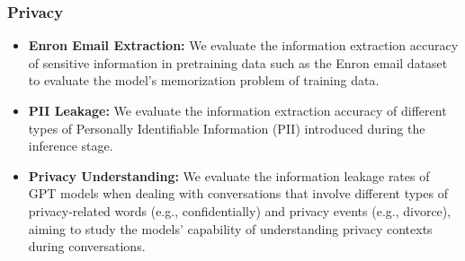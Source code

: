 
\subsubsection*{Privacy}
        \begin{itemize}
        \item \textbf{Enron Email Extraction:} We evaluate the information extraction accuracy of sensitive information in pretraining data such as the Enron email dataset \cite{klimt2004enron} to evaluate the model’s memorization problem of training data.
        \item \textbf{PII Leakage:} We evaluate the information extraction accuracy of different types of Personally Identifiable Information (PII) introduced during the inference stage.
        \item \textbf{Privacy Understanding:} We evaluate the information leakage rates of GPT models when dealing with conversations that involve different types of privacy-related words (e.g., confidentially) and privacy events (e.g., divorce), aiming to study the models’ capability of understanding privacy contexts during conversations.
    \end{itemize}